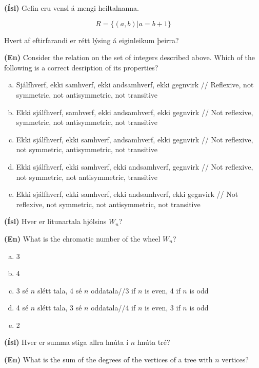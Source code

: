 \documentclass[addpoints]{exam}
\begin{document}
\begin{questions}
\textbf{(Ísl)} Gefin eru vensl á mengi heiltalnanna.

\[
    R = \{(a,b)|a=b+1\}
\]

Hvert af eftirfarandi er rétt lýsing á eiginleikum þeirra?

\textbf{(En)} Consider the relation on the set of integers described above. Which of the following is a correct desription of its properties?

\begin{enumerate}[a)]
    \item Sjálfhverf, ekki samhverf, ekki andsamhverf, ekki gegnvirk // Reflexive, not symmetric, not antisymmetric, not transitive    
    \item Ekki sjálfhverf, samhverf, ekki andsamhverf, ekki gegnvirk // Not reflexive, symmetric, not antisymmetric, not transitive
    \item Ekki sjálfhverf, ekki samhverf, andsamhverf, ekki gegnvirk // Not reflexive, not symmetric, antisymmetric, not transitive %
    \item Ekki sjálfhverf, ekki samhverf, ekki andsamhverf, gegnvirk // Not reflexive, not symmetric, not antisymmetric, transitive
    \item Ekki sjálfhverf, ekki samhverf, ekki andsamhverf, ekki gegnvirk // Not reflexive, not symmetric, not antisymmetric, not transitive
\end{enumerate}

\newpage

\question[3] 

\textbf{(Ísl)} Hver er litunartala hjólsins $W_n$?

\textbf{(En)} What is the chromatic number of the wheel $W_n$?

\begin{enumerate}[a)]
    \item 3
    \item 4
    \item 3 sé $n$ slétt tala, 4 sé $n$ oddatala//3 if $n$ is even, 4 if $n$ is odd
    \item 4 sé $n$ slétt tala, 3 sé $n$ oddatala//4 if $n$ is even, 3 if $n$ is odd
    \item 2
\end{enumerate}

\question[3]

\textbf{(Ísl)} Hver er summa stiga allra hnúta í $n$ hnúta tré?

\textbf{(En)} What is the sum of the degrees of the vertices of a tree with $n$ vertices?


\end{questions}
\end{document}
